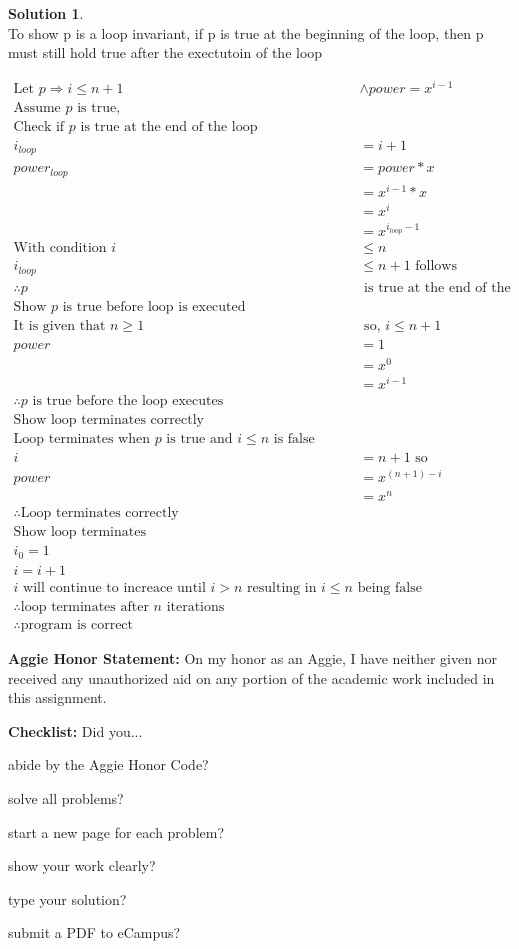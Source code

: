\documentclass{article}
\theoremstyle{definition}
\newtheorem*{solution}{Solution}
\newcommand{\honor}{\noindent \textbf{Aggie Honor Statement: }On my honor as an Aggie, I have neither
  given nor received any unauthorized aid on any portion of the academic work included in this assignment.
}
\newcommand{\checklist}{\noindent\textbf{Checklist:}
Did you...
\begin{compactenum}
\item abide by the Aggie Honor Code?
\item solve all problems?
\item start a new page for each problem?
\item show your work clearly?
\item type your solution?
\item submit a PDF to eCampus?
\end{compactenum}
}
\begin{document}
\begin{solution}\ \\
To show p is a loop invariant, if p is true at the beginning of the loop, then p must still hold true after the exectutoin of the loop
\begin{center}
\begin{align*}
  \text{Let } p \Rightarrow i \leq n+1 &\wedge power = x^{i-1} \\
  \text{Assume } p \text{ is true,} \\
  \text{Check if $p$ is true at the end of the loop}\\
  i_{loop} &= i+1 \\
  power_{loop} &= power * x\\
   &= x^{i-1} * x \\
   &= x^i \\
   &= x^{i_{loop}-1} \\
   \text{With condition } i &\leq n \\
   i_{loop} &\leq n+1 \text{ follows} \\
   \therefore p &\text{ is true at the end of the loop}\\
   \text{Show $p$ is true before loop is executed}\\
   \text{It is given that } n \geq 1 & \text{ so, } i \leq n+1 \\
   power &= 1 \\
   &= x^0 \\
   &= x^{i-1} \\
   \therefore p \text{ is true before the loop executes}\\
   \text{Show loop terminates correctly}\\
   \text{Loop terminates when $p$ is true and $i \leq n$ is false}\\
   i &= n + 1 \text{ so }\\
   power &= x^{(n+1)-i} \\
   &= x^n \\
   \therefore \text{Loop terminates correctly} \\
   \text{Show loop terminates} \\
   i_0 = 1 \\
   i = i + 1\\
   i \text{ will continue to increace until } i > n \text{ resulting in }i \leq n \text{ being false} \\
   \therefore \text{loop terminates after $n$ iterations} \\
   \therefore \text{program is correct}
\end{align*}
\end{center}
\end{solution}

\newpage


\bigskip
\honor

\bigskip
\checklist
\end{document}
